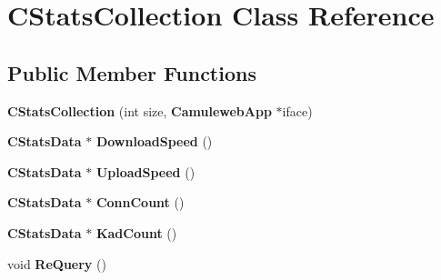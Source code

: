 \section{CStatsCollection Class Reference}
\label{classCStatsCollection}
\subsection*{Public Member Functions}
\begin{DoxyCompactItemize}
\item 
{\bfseries CStatsCollection} (int size, {\bf CamulewebApp} $\ast$iface)\label{classCStatsCollection_a40aa83ce1fcd3d4755dd3a4975a1165d}

\item 
{\bf CStatsData} $\ast$ {\bfseries DownloadSpeed} ()\label{classCStatsCollection_a9869b51a38a85e8d2590d053af2e25d0}

\item 
{\bf CStatsData} $\ast$ {\bfseries UploadSpeed} ()\label{classCStatsCollection_ae99a1734c1cf4fea78b67f415464794c}

\item 
{\bf CStatsData} $\ast$ {\bfseries ConnCount} ()\label{classCStatsCollection_aef569d263008a86306a085abefff83e3}

\item 
{\bf CStatsData} $\ast$ {\bfseries KadCount} ()\label{classCStatsCollection_a5e0c8092c16406e8db01b7ddc95cd6a5}

\item 
void {\bfseries ReQuery} ()\label{classCStatsCollection_a68b52176de202cf3ba12ccf6fd0d001e}

\end{DoxyCompactItemize}
